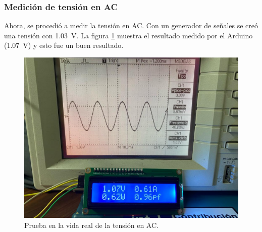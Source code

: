\subsubsection{Medición de tensión en AC}
Ahora, se procedió a medir la tensión en AC. Con un generador de señales se creó una tensión con \SI{1.03}{\volt}. La figura \ref{voltage-low-ac} muestra el resultado medido por el Arduino (\SI{1.07}{\volt}) y esto fue un buen resultado.
\begin{figure}[h]
    \centering
    \includegraphics[width=12cm]{Imagenes/Tension_AC.jpg}
    \caption{Prueba en la vida real de la tensión en AC.}
    \label{voltage-low-ac}
\end{figure}
\FloatBarrier

